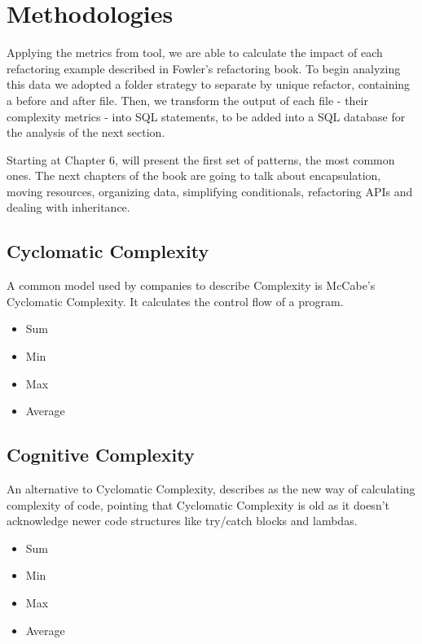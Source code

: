 \section{Methodologies}

Applying the metrics from \cite{article:mozilla} tool, we are able to calculate the impact of each refactoring example
described in Fowler's refactoring book. To begin analyzing this data we adopted a folder strategy to separate by unique refactor,
containing a before and after file. Then, we transform the output of each file - their complexity metrics - into SQL statements,
to be added into a SQL database for the analysis of the next section.

Starting at Chapter 6, \cite{book:refactoring} will present the first set of patterns, the most common ones.
The next chapters of the book are going to talk about encapsulation, moving resources, organizing data, simplifying conditionals,
refactoring APIs and dealing with inheritance.

\subsection{Cyclomatic Complexity}

A common model used by companies to describe Complexity is McCabe's Cyclomatic Complexity. It calculates the control flow of a program.

\begin{itemize}
  \item Sum
  \item Min
  \item Max
  \item Average
\end{itemize}


\subsection{Cognitive Complexity}

An alternative to Cyclomatic Complexity, \cite{article:sonarpaper} describes as the new way of calculating complexity of code,
pointing that Cyclomatic Complexity is old as it doesn't acknowledge newer code structures like try/catch blocks and lambdas.

\begin{itemize}
  \item Sum
  \item Min
  \item Max
  \item Average
\end{itemize}


